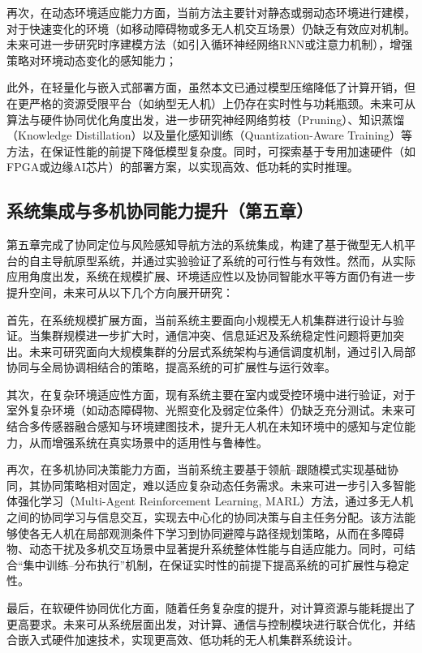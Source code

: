 再次，在动态环境适应能力方面，当前方法主要针对静态或弱动态环境进行建模，对于快速变化的环境（如移动障碍物或多无人机交互场景）仍缺乏有效应对机制。未来可进一步研究时序建模方法（如引入循环神经网络RNN或注意力机制），增强策略对环境动态变化的感知能力；

此外，在轻量化与嵌入式部署方面，虽然本文已通过模型压缩降低了计算开销，但在更严格的资源受限平台（如纳型无人机）上仍存在实时性与功耗瓶颈。未来可从算法与硬件协同优化角度出发，进一步研究神经网络剪枝（Pruning）、知识蒸馏（Knowledge Distillation）以及量化感知训练（Quantization-Aware Training）等方法，在保证性能的前提下降低模型复杂度。同时，可探索基于专用加速硬件（如FPGA或边缘AI芯片）的部署方案，以实现高效、低功耗的实时推理。


\subsection{系统集成与多机协同能力提升（第五章）}

第五章完成了协同定位与风险感知导航方法的系统集成，构建了基于微型无人机平台的自主导航原型系统，并通过实验验证了系统的可行性与有效性。然而，从实际应用角度出发，系统在规模扩展、环境适应性以及协同智能水平等方面仍有进一步提升空间，未来可从以下几个方向展开研究：

首先，在系统规模扩展方面，当前系统主要面向小规模无人机集群进行设计与验证。当集群规模进一步扩大时，通信冲突、信息延迟及系统稳定性问题将更加突出。未来可研究面向大规模集群的分层式系统架构与通信调度机制，通过引入局部协同与全局协调相结合的策略，提高系统的可扩展性与运行效率。

其次，在复杂环境适应性方面，现有系统主要在室内或受控环境中进行验证，对于室外复杂环境（如动态障碍物、光照变化及弱定位条件）仍缺乏充分测试。未来可结合多传感器融合感知与环境建图技术，提升无人机在未知环境中的感知与定位能力，从而增强系统在真实场景中的适用性与鲁棒性。

再次，在多机协同决策能力方面，当前系统主要基于领航–跟随模式实现基础协同，其协同策略相对固定，难以适应复杂动态任务需求。未来可进一步引入多智能体强化学习（Multi-Agent Reinforcement Learning, MARL）方法，通过多无人机之间的协同学习与信息交互，实现去中心化的协同决策与自主任务分配。该方法能够使各无人机在局部观测条件下学习到协同避障与路径规划策略，从而在多障碍物、动态干扰及多机交互场景中显著提升系统整体性能与自适应能力。同时，可结合“集中训练–分布执行”机制，在保证实时性的前提下提高系统的可扩展性与稳定性。

最后，在软硬件协同优化方面，随着任务复杂度的提升，对计算资源与能耗提出了更高要求。未来可从系统层面出发，对计算、通信与控制模块进行联合优化，并结合嵌入式硬件加速技术，实现更高效、低功耗的无人机集群系统设计。
